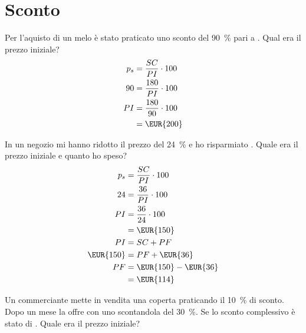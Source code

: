\section{Sconto}
\begin{exercise}
	Per l'aquisto di un melo è stato praticato uno sconto del  \SI{90}{\percent} pari a  . Qual era il prezzo iniziale?
	\tcblower
	\begin{align*}
		p_s={}&\dfrac{SC}{PI}\cdot 100\\
		90={}&\dfrac{180}{PI}\cdot 100\\
		PI={}&\dfrac{180}{90}\cdot 100\\
		={}&\mbox{\EUR{200}}
	\end{align*}
\end{exercise}
\begin{exercise}
In un negozio mi hanno ridotto il prezzo del  \SI{24}{\percent} e ho risparmiato . Quale era il prezzo iniziale e quanto ho speso?
	\tcblower
	\begin{align*}
		p_s={}&\dfrac{SC}{PI}\cdot 100\\
		24={}&\dfrac{36}{PI}\cdot 100\\
		PI={}&\dfrac{36}{24}\cdot 100\\
		={}&\mbox{\EUR{150}}\\
		PI={}&SC+PF\\
		\mbox{\EUR{150}}={}&PF+\mbox{\EUR{36}}\\
		PF={}&\mbox{\EUR{150}}-\mbox{\EUR{36}}\\
		={}&\mbox{\EUR{114}}\\
	\end{align*}
\end{exercise}
\begin{exercise}[no solution]
	Un commerciante mette in vendita una coperta praticando il \SI{10}{\percent} di sconto. Dopo un mese  la offre con uno scontandola del \SI{30}{\percent}. Se lo sconto complessivo è stato di . Quale era il prezzo iniziale?
\end{exercise}
